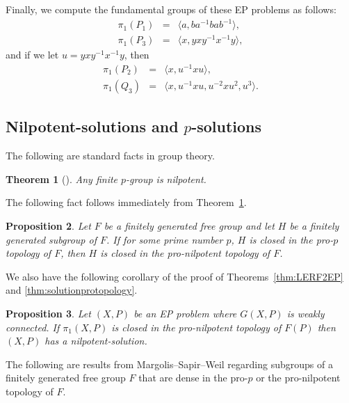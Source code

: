 \documentclass[11pt]{amsart}
\newtheorem{theorem}{Theorem}[section]
\newtheorem{proposition}[theorem]{Proposition}
\theoremstyle{definition}
\theoremstyle{definition}
\numberwithin{equation}{section}
\begin{document}
Finally, we compute the fundamental groups of these EP problems as follows:
$$\begin{array}{rcl} \pi_1(P_1)&=&\langle a, ba^{-1}bab^{-1}\rangle, \\
\pi_1(P_3)&=&\langle x, yxy^{-1}x^{-1}y\rangle,
\end{array}
$$
and if we let $u=yxy^{-1}x^{-1}y$, then
$$\begin{array}{rcl}
\pi_1(P_2)&=&\langle x, u^{-1}xu\rangle, \\
\pi_1(Q_3)&=&\langle x, u^{-1}xu, u^{-2}xu^2, u^3\rangle.
\end{array}
$$



\subsection{Nilpotent-solutions and $p$-solutions\label{subsec:nilsolution}}

The following are standard facts in group theory. 

\begin{theorem}[{\cite[5.1.3]{RobinsonBook}}]\label{thm:pnil} Any finite $p$-group is nilpotent.
\end{theorem}


The following fact follows immediately from Theorem~\ref{thm:pnil}.

\begin{proposition} Let $F$ be a finitely generated free group and let $H$ be a finitely generated subgroup of $F$. If for some prime number $p$, $H$ is closed in the pro-$p$ topology of $F$, then $H$ is closed in the pro-nilpotent topology of $F$.
\end{proposition}

We also have the following corollary of the proof of Theorems~\ref{thm:LERF2EP} and \ref{thm:solutionprotopology}.

\begin{proposition}\label{prop:pronil} Let $(X, P)$ be an EP problem where $G(X, P)$ is weakly connected. If $\pi_1(X,P)$ is closed in the pro-nilpotent topology of $F(P)$ then $(X, P)$ has a nilpotent-solution.
\end{proposition}

The following are results from Margolis--Sapir--Weil \cite{MSW01} regarding subgroups of a finitely generated free group $F$ that are dense in the pro-$p$ or the pro-nilpotent topology of $F$. 
\end{document}
